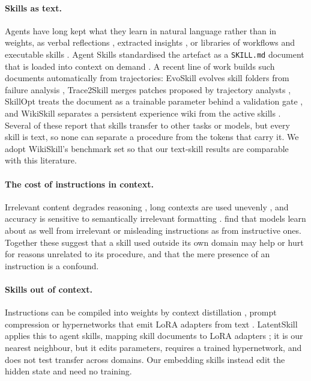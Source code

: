 \documentclass[11pt]{article}
\begin{document}
\paragraph{Skills as text.} Agents have long kept what they learn in natural language rather than in
weights, as verbal reflections \citep{shinn2023reflexion}, extracted insights \citep{zhao2024expel},
or libraries of workflows and executable skills
\citep{wang2024voyager,wang2025awm,wang2025asi,zheng2025skillweaver}. Agent Skills standardised the
artefact as a \texttt{SKILL.md} document that is loaded into context on demand
\citep{anthropic2025skills,xu2026agentskills}. A recent line of work builds such documents
automatically from trajectories: EvoSkill evolves skill folders from failure analysis
\citep{alzubi2026evoskill}, Trace2Skill merges patches proposed by trajectory analysts
\citep{ni2026trace2skill}, SkillOpt treats the document as a trainable parameter behind a validation
gate \citep{yang2026skillopt}, and WikiSkill separates a persistent experience wiki from the active
skills \citep{tang2026wikiskill}. Several of these report that skills transfer to other tasks or
models, but every skill is text, so none can separate a procedure from the tokens that carry it. We
adopt WikiSkill's benchmark set so that our text-skill results are comparable with this literature.

\paragraph{The cost of instructions in context.} Irrelevant content degrades reasoning
\citep{shi2023distracted}, long contexts are used unevenly \citep{liu2024lost}, and accuracy is
sensitive to semantically irrelevant formatting \citep{sclar2024formatting}.
\citet{webson2022prompts} find that models learn about as well from irrelevant or misleading
instructions as from instructive ones. Together these suggest that a skill used outside its own
domain may help or hurt for reasons unrelated to its procedure, and that the mere presence of an
instruction is a confound.

\paragraph{Skills out of context.} Instructions can be compiled into weights by context distillation
\citep{snell2022distilling}, prompt compression \citep{mu2023gist} or hypernetworks that emit LoRA
adapters from text \citep{hu2022lora,charakorn2025t2l}. LatentSkill applies this to agent skills,
mapping skill documents to LoRA adapters \citep{yu2026latentskill}; it is our nearest neighbour, but
it edits parameters, requires a trained hypernetwork, and does not test transfer across domains. Our
embedding skills instead edit the hidden state and need no training.
\end{document}
